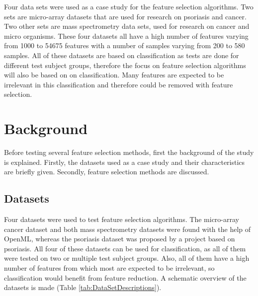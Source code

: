 \documentclass[10pt,a4paper]{article}
\begin{document}
	Four data sets were used as a case study for the feature selection algorithms. Two sets are micro-array datasets that are used for research on psoriasis\cite{nair2009genome, suarez2012expanding, bigler2013cross, yao2008type} and cancer\cite{wojnarski2010rsctc}. Two other sets are mass spectrometry data sets, used for research on cancer\cite{NIPS2004_2728} and micro organisms\cite{doi:10.1093/bioinformatics/btu022}. These four datasets all have a high number of features varying from 1000 to 54675 features with a number of samples varying from 200 to 580 samples. All of these datasets are based on classification as tests are done for different test subject groups, therefore the focus on feature selection algorithms will also be based on on classification. Many features are expected to be irrelevant in this classification and therefore could be removed with feature selection.	
	
	\section{Background}
	\label{sec:Background}
	
	Before testing several feature selection methods, first the background of the study is explained. Firstly, the datasets used as a case study and their characteristics are briefly given. Secondly, feature selection methods are discussed.
	
	\subsection{Datasets}
	\label{subsec:Datasets}
	
	Four datasets were used to test feature selection algorithms. The micro-array cancer dataset and both mass spectrometry datasets were found with the help of OpenML\cite{OpenML2013}, whereas the psoriasis dataset was proposed by a project based on psoriasis\cite{felix2017dynamic}. All four of these datasets can be used for classification, as all of them were tested on two or multiple test subject groups. Also, all of them have a high number of features from which most are expected to be irrelevant, so classification would benefit from feature reduction. A schematic overview of the datasets is made (Table \ref{tab:DataSetDescriptions}).
	
\end{document}
